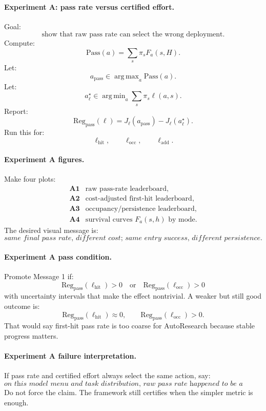 \documentclass{article}
\DeclareMathOperator*{\argmin}{arg\,min}
\DeclareMathOperator*{\argmax}{arg\,max}
\begin{document}
\paragraph{Experiment A: pass rate versus certified effort.}
Goal:
\[
    \text{show that raw pass rate can select the wrong deployment.}
\]
Compute:
\[
    \mathrm{Pass}(a)
    =
    \sum_s\pi_sF_a(s,H).
\]
Let:
\[
    a_{\mathrm{pass}}
    \in
    \argmax_a \mathrm{Pass}(a).
\]
Let:
\[
    a_{\ell}^{\star}
    \in
    \argmin_a \sum_s\pi_s\ell(a,s).
\]
Report:
\[
    \mathrm{Reg}_{\mathrm{pass}}(\ell)
    =
    J_\ell(a_{\mathrm{pass}})-J_\ell(a_\ell^\star).
\]
Run this for:
\[
    \ell_{\mathrm{hit}},
    \qquad
    \ell_{\mathrm{occ}},
    \qquad
    \ell_{\mathrm{add}}.
\]

\paragraph{Experiment A figures.}
Make four plots:
\[
\begin{array}{ll}
    \textbf{A1} & \text{raw pass-rate leaderboard},\\
    \textbf{A2} & \text{cost-adjusted first-hit leaderboard},\\
    \textbf{A3} & \text{occupancy/persistence leaderboard},\\
    \textbf{A4} & \text{survival curves \(F_a(s,h)\) by mode}.
\end{array}
\]
The desired visual message is:
\[
    \textit{same final pass rate, different cost; same entry success, different persistence.}
\]

\paragraph{Experiment A pass condition.}
Promote Message 1 if:
\[
    \mathrm{Reg}_{\mathrm{pass}}(\ell_{\mathrm{hit}})>0
    \quad\text{or}\quad
    \mathrm{Reg}_{\mathrm{pass}}(\ell_{\mathrm{occ}})>0
\]
with uncertainty intervals that make the effect nontrivial.
A weaker but still good outcome is:
\[
    \mathrm{Reg}_{\mathrm{pass}}(\ell_{\mathrm{hit}})\approx 0,
    \qquad
    \mathrm{Reg}_{\mathrm{pass}}(\ell_{\mathrm{occ}})>0.
\]
That would say first-hit pass rate is too coarse for AutoResearch because stable progress matters.

\paragraph{Experiment A failure interpretation.}
If pass rate and certified effort always select the same action, say:
\[
    \textit{on this model menu and task distribution, raw pass rate happened to be
    a sufficient proxy.}
\]
Do not force the claim.
The framework still certifies when the simpler metric is enough.
\end{document}
